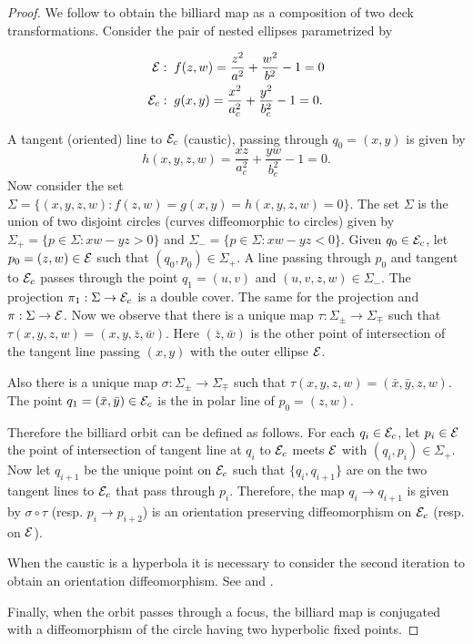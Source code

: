  \begin{proof}
 We follow \cite{bry} to obtain the billiard map as a composition of two deck transformations.  Consider the pair of nested   ellipses parametrized by
 
 \begin{align*}
     \mathcal{E}:&\;\; f(z,w)=\frac{z^2}{a^2}+\frac{w^2}{b^2}-1=0\\
     \mathcal{E}_c:&\;\; g(x,y)= \frac{x^2}{a_c^2}+\frac{y^2}{b_c^2}-1=0.
 \end{align*}
 
 A tangent (oriented) line to $\mathcal{E}_c$ (caustic), passing through $q_0=(x,y)$ is given by
 \[h(x,y,z,w) =\frac{xz}{a_c^2}+\frac{yw}{b_c^2}-1=0.\]
 Now consider the set
 $\Sigma= \{(x,y,z,w): f(z,w)=g(x,y)=h(x,y,z,w)=0\}.$  
 The set $\Sigma$ is the union of two disjoint circles (curves  diffeomorphic  to circles) given by
 $\Sigma_+=\{p\in \Sigma: xw-yz>0\} $ and
  $\Sigma_-=\{p\in \Sigma: xw-yz<0\}. $
  Given $q_0\in\mathcal{E}_c$, let $p_0=(z,w)\in \mathcal{E}$ such that $(q_0,p_0)\in\Sigma_+.$ A line passing through $p_0$ and tangent to $\mathcal{E}_c$ passes through the point $q_1=(u,v)$ and $(u,v,z,w)\in\Sigma_-.$ 
 The projection  $\pi_1:\Sigma \to \mathcal{E}_c$ is a double cover. The same for the projection
 and $\pi:\Sigma\to \mathcal{E}$. 
 Now we observe that there is a unique map $\tau:\Sigma_{\pm}\to \Sigma_{\mp}$ such that $\tau(x,y,z,w)=(x,y,\bar{z},\bar{w})$. Here $(\bar{z},\bar{w})$ is the other point of intersection of the tangent line passing $(x,y)$ with the outer ellipse $\mathcal{E}$.
 
Also there is a unique map $\sigma:\Sigma_{\pm}\to \Sigma_{\mp}$ such that $\tau(x,y,z,w)=( \bar{x},\bar{y},z,w)$. The point $q_1=( \bar{x},\bar{y})\in\mathcal{E}_c$ is the in polar line of $p_0=(z,w)$. 
 
 
 Therefore the billiard orbit can be defined as follows. For each $q_i\in \mathcal{E}_c$, let $p_i\in\mathcal{E}$ the point of intersection of tangent line at $q_i$ to $\mathcal{E}_c$ meets $\mathcal{E}$ with $(q_i,p_i)\in\Sigma_{+}$. Now let $q_{i+1}$ be the unique point on $\mathcal{E}_c$ such that $\{q_i,q_{i+1}\}$ are on the two tangent lines to $\mathcal{E}_c$ that pass through $p_i$. Therefore,   the map $q_i\to q_{i+1}$ is given by $\sigma\circ \tau$ (resp. $p_i\to p_{i+2}$) is an orientation preserving diffeomorphism on $\mathcal{E}_c$ (resp. on $\mathcal{E}$).

When the caustic is a hyperbola it is necessary to consider the second iteration to obtain an orientation diffeomorphism. See \cite{birkhoff1922} and \cite{kolod1985}.

Finally, when the orbit passes through a focus, the billiard map is conjugated with a diffeomorphism of the circle having two hyperbolic fixed points.
\end{proof}
 


